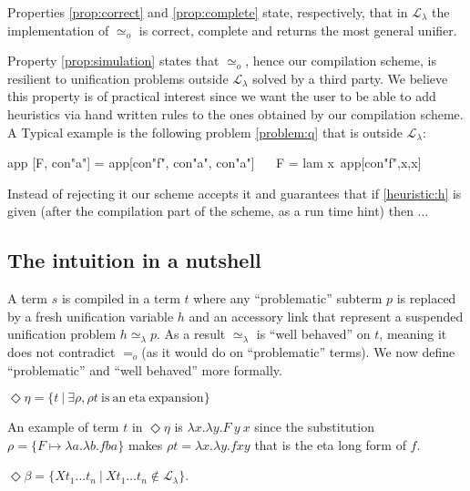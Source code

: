 \documentclass[sigconf,natbib=false,review]{acmart}
\newcommand{\EqualRel}{\ensuremath{=}}
\newcommand{\UnifRel}{\ensuremath{\simeq}}
\newcommand{\Uo}{\ensuremath{\UnifRel_o}\xspace}
\newcommand{\Eo}{\ensuremath{\EqualRel_o}\xspace}
\newcommand{\Ue}{\ensuremath{\UnifRel_\lambda}\xspace}
\newcommand{\llambda}{\ensuremath{\mathcal{L}_\lambda}\xspace}
\begin{document}
Properties \ref{prop:correct} and \ref{prop:complete} state, respectively, that
in \llambda the implementation of \Uo is correct, complete and returns the most
general unifier.

Property \ref{prop:simulation} states that \Uo, hence our compilation scheme,
is resilient to unification problems outside \llambda solved by
a third party. We believe this property is of practical interest since we
want the user to be able to add heuristics via hand written rules
to the ones obtained by our compilation scheme. A Typical example
is the following problem \ref{problem:q} that is outside \llambda:

\begin{elpicode}
app [F, con"a"] = app[con"f", con"a", con"a"]          ~~
F = lam x\ app[con"f",x,x]                             ~~
\end{elpicode}

\noindent
Instead of rejecting it our scheme accepts it and guarantees that if
\ref{heuristic:h} is given (after the compilation part of the scheme, as
a run time hint) then ...


\subsection{The intuition in a nutshell}
\label{sec:nutshell}
A term $s$ is compiled in a term $t$ where any
``problematic'' subterm $p$ is replaced by a fresh unification variable $h$
and an accessory link that represent a suspended unification problem
$h \Ue p$. As a result \Ue is ``well behaved'' on $t$, meaning it does not
contradict \Eo (as it would do on ``problematic'' terms).
We now define ``problematic'' and ``well behaved'' more formally.

\newcommand{\maybeeta}{\ensuremath{\Diamond\eta}\xspace}
\newcommand{\maybebeta}{\ensuremath{\Diamond\beta}\xspace}
\begin{definition}[\maybeeta]
  $\maybeeta = \{ t ~|~ \exists \rho, \rho t ~\mathrm{is~an~eta~expansion} \}$
\end{definition}

\noindent
An example of term $t$ in \maybeeta{} is
$\lambda x.\lambda y.F~y~x$
since the substitution
$\rho = \{ F \mapsto \lambda a.\lambda b.fba\}$
makes $\rho t = \lambda x.\lambda y.f x y$
that is the eta long form of $f$.

\begin{definition}[\maybebeta]
  $\maybebeta = \{ X t_1 \ldots t_n ~|~ X t_1 \ldots t_n \not\in \llambda \}$.
\end{definition}
\end{document}
